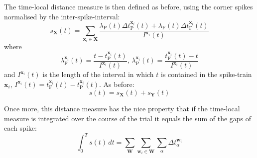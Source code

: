 \documentclass[11pt]{amsart}
\begin{document}
The time-local distance measure is then defined as before, using the corner spikes normalised by the inter-spike-interval:
\begin{equation}
s_{\mathbf{X}}(t) = \sum_{\mathbf{x}_i \in \mathbf{X}} \frac{\lambda_{\mathrm{P}}(t)\Delta t_{\mathrm{P}}^{\mathbf{x}_i} (t) + \lambda_{\mathrm{F}}(t)\Delta t_{\mathrm{F}}^{\mathbf{x}_i}(t) }{I^{\mathbf{x}_i}(t) }%
\end{equation}
where 
\begin{equation}
\lambda_{\mathrm{F}}^{\mathbf{x}_i}(t) =\frac{ t-t_{\mathrm{P}}^{\mathbf{x}_i}(t)}{I^{\mathbf{x}_i}(t)}%
, \, \lambda_{\mathrm{P}}^{\mathbf{x}_i}(t) =\frac{ t_{\mathrm{F}}^{\mathbf{x}_i}(t) - t}{I^{\mathbf{x}_i}(t)}%
\end{equation}
and $I^{\mathbf{x}_i}(t)$ is the length of the interval in which $t$ is contained in the spike-train $\mathbf{x}_i$, $I^{\mathbf{x}_i}(t) = t_{\mathrm{F}}^{\mathbf{x}_i}(t) - t_{\mathrm{P}}^{\mathbf{x}_i}(t)$.
 As before:
\begin{equation}
s(t) = s_{\mathbf{X}}(t) + s_{\mathbf{Y}}(t)
\end{equation}

Once more, this distance measure has the nice property that if the time-local measure is integrated over the course of the trial it equals the sum of the gaps of each spike:
\begin{equation}
\int_0^T s(t)\,dt = \sum_{\mathbf{W}} \sum_{\mathbf{w}_i \in \mathbf{W}} \sum_{\alpha} \Delta t_{\alpha}^{\mathbf{w}_i}
\end{equation}
\end{document}
